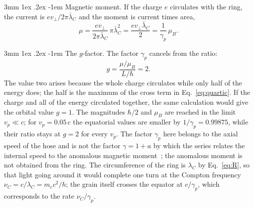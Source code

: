 \documentclass[%
 reprint, amsmath,amssymb, aps, prb, ]{revtex4-2}
\makeatletter
\numberwithin{equation}{section}
\renewcommand\paragraph{%
  \@startsection{paragraph}{4}{\z@}%
    {3mm \@plus 1ex \@minus .2ex}%
    {-1em}%
    {\normalfont\normalsize\itshape}}
\newcommand{\lamC}{\lambda_C}
\newcommand{\lbar}{\bar{\lambda}_C}
\makeatother
\begin{document}
\paragraph{Magnetic moment.} If the charge $e$ circulates with the ring, the current is $e v_\perp/2\pi\lbar$ and the moment is current times area,
\begin{equation}
\mu = \frac{e v_\perp}{2\pi\lbar}\,\pi\lbar^2 = \frac{e v_\perp \lbar}{2} = \frac{1}{\gamma_p}\,\mu_B .
\label{eq:mu}
\end{equation}

\paragraph{The $g$-factor.} The factor $\gamma_p$ cancels from the ratio:
\begin{equation}
g = \frac{\mu/\mu_B}{L/\hbar} = 2 .
\label{eq:g}
\end{equation}
The value two arises because the whole charge circulates while only half of the energy does; the half is the maximum of the cross term in Eq.~\eqref{eq:quartic}. If the charge and all of the energy circulated together, the same calculation would give the orbital value $g = 1$. The magnitudes $\hbar/2$ and $\mu_B$ are reached in the limit $v_p \ll c$; for $v_p = 0.05\,c$ the equatorial values are smaller by $1/\gamma_p = 0.99875$, while their ratio stays at $g = 2$ for every $v_p$. The factor $\gamma_p$ here belongs to the axial speed of the hose and is not the factor $\gamma = 1 + a$ by which the series relates the internal speed to the anomalous magnetic moment~\cite{H15}; the anomalous moment is not obtained from the ring. The circumference of the ring is $\lamC$ by Eq.~\eqref{eq:R}, so that light going around it would complete one turn at the Compton frequency $\nu_C = c/\lamC = m_ec^2/h$; the grain itself crosses the equator at $c/\gamma_p$, which corresponds to the rate $\nu_C/\gamma_p$.
\end{document}
